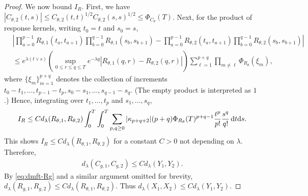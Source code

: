 \begin{proof}
We now bound \(I_R\). First,
we have $|C_{\theta,2}(t,s)|
  \le C_{\theta,2}(t,t)^{1/2} C_{\theta,2}(s,s)^{1/2} \le 
  \Phi_{C_\theta}(T)$.
Next, for the product of response kernels, writing $t_0=t$ and $s_0=s$,
\begin{align*}
&\left|
  \prod_{a=0}^{p-1}R_{\theta,1}(t_a,t_{a+1})
  \prod_{b=0}^{q-1}R_{\theta,1}(s_b,s_{b+1})
  -
  \prod_{a=0}^{p-1}R_{\theta,2}(t_a,t_{a+1})
  \prod_{b=0}^{q-1}R_{\theta,2}(s_b,s_{b+1})
\right|\\
&\le e^{\lambda(t\vee s)}
\left(
    \sup_{0\le r\le q\le T}
    e^{-\lambda q}|R_{\theta,1}(q,r)-R_{\theta,2}(q,r)|
  \right)
\sum_{\ell=1}^{p+q}
\prod_{m\ne \ell} \Phi_{R_\theta}(\xi_m),
\end{align*}
where \(\{\xi_m\}_{m=1}^{p+q}\) denotes the collection of increments
  $t_0-t_1,\ldots,t_{p-1}-t_p,
  s_0-s_1,\ldots,s_{q-1}-s_q$.
(The empty product is interpreted as \(1\).) 
Hence, integrating over $t_1,\ldots,t_p$ and $s_1,\ldots,s_q$,
\[
  I_R
  \le
  Cd_\lambda(R_{\theta,1},R_{\theta,2})
  \int_0^T\int_0^T
    \sum_{p,q\ge 0}
    |\kappa_{p+q+2}|(p+q)\Phi_{R_\theta}(T)^{p+q-1}
    \frac{t^p}{p!}\frac{s^q}{q!}\,
  \mathrm{d} t \mathrm{d} s.
\]
This shows
$I_R \le C d_\lambda(R_{\theta,1}, R_{\theta,2})$ for a constant $C>0$ not
depending on $\lambda$. Therefore,
\begin{align*}
   d_{\lambda}(C_{g,1},C_{g,2}) \le C d_\lambda(Y_1,Y_2).
  \end{align*}
  By \eqref{eq:dmft-Rg} and a similar argument omitted for brevity,
  $d_{\lambda}(R_{g,1}, R_{g,2}) \le Cd_{\lambda}(R_{\theta,1}, R_{\theta,2})$.
Thus
    $d_\lambda(X_1,X_2) \leq Cd_\lambda(Y_1,Y_2)$.
\end{proof}

